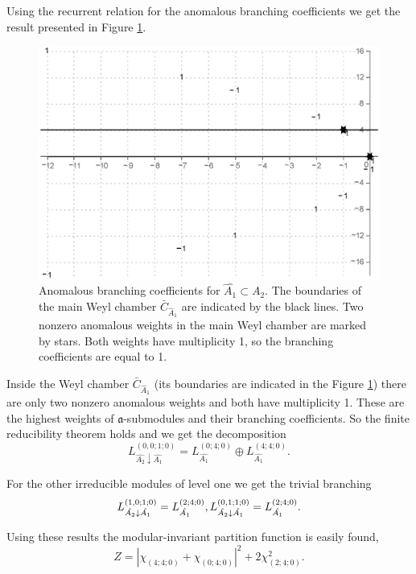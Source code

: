 \documentclass[12pt]{iopart}
\theoremstyle{definition}
\newcommand{\af}{\mathfrak{a}}
\begin{document}
Using the recurrent relation for the anomalous branching coefficients
we get the result presented in Figure \ref{fig:AffineA2_A1_branching}.
\begin{figure}[h!tb]
  \centering
  \includegraphics[width=130mm]{figure9.eps}
  \caption{Anomalous branching coefficients for $\hat{A_1}\subset \hat{A_2}$. The boundaries  of the main Weyl chamber $\bar{C}_{\hat{A}_1}$
 are indicated by the black lines. Two nonzero anomalous weights in the main Weyl chamber are marked by stars. Both weights have multiplicity 1, so the branching coefficients are equal to 1.}
  \label{fig:AffineA2_A1_branching}
\end{figure}
Inside the Weyl chamber $\bar{C}_{\hat{A}_1}$
(its boundaries are indicated in the Figure \ref{fig:AffineA2_A1_branching})
there are only two nonzero anomalous weights and both have multiplicity 1.
These are the highest weights of $\af$-submodules and their branching
coefficients. So the finite reducibility theorem holds and we get the decomposition
\begin{equation*}
  \label{eq:43}
  L^{(0,0;1;0)}_{\hat{A_2}\downarrow \hat{A_1}}= L_{\hat{A_1}}^{(0;4;0)}\oplus L_{\hat{A_1}}^{(4;4;0)}.
\end{equation*}

For the other irreducible modules of level one  we get the trivial
branching
\begin{equation*}
  \label{eq:44}
   L^{(1,0;1;0)}_{\hat{A_2}\downarrow \hat{A_1}}= L_{\hat{A_1}}^{(2;4;0)},\\
   L^{(0,1;1;0)}_{\hat{A_2}\downarrow \hat{A_1}}= L_{\hat{A_1}}^{(2;4;0)}.
\end{equation*}

Using these results the modular-invariant partition function is easily found,
\begin{equation*}
  \label{eq:45}
  Z=\left|\chi_{(4;4;0)}+\chi_{(0;4;0)}\right|^2+2\chi_{(2;4;0)}^2.
\end{equation*}
\end{document}
